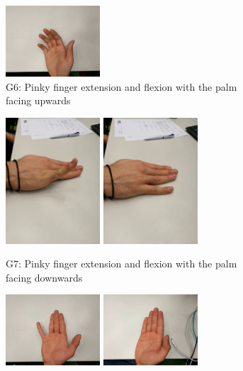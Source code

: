 \begin{figure}
\begin{subfigure}[t]{0.5\linewidth}
  \includegraphics[width=100pt]{figures/flx_pinky1}
  \caption{G6: Pinky finger extension and flexion with the palm facing upwards}
  \end{subfigure}\par\medskip
  \begin{subfigure}[t]{0.5\linewidth}
  \includegraphics[width=100pt]{figures/ext_pinky2}
  \includegraphics[width=100pt]{figures/flx_pinky2}
  \caption{G7: Pinky finger extension and flexion with the palm facing downwards}
  \end{subfigure}
  \hspace*{\fill}
  \begin{subfigure}[t]{0.5\linewidth}
  \includegraphics[width=100pt]{figures/ext_pinkytopair}
  \includegraphics[width=100pt]{figures/flx_pinkytopair}

\end{subfigure}
\end{figure}
